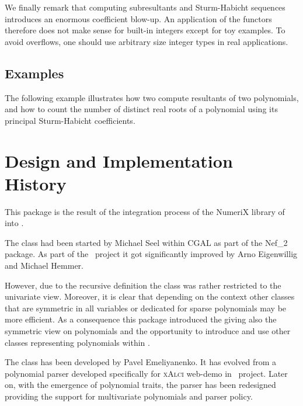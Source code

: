We finally remark that computing subresultants and Sturm-Habicht sequences
introduces an enormous coefficient blow-up.
An application of the functors therefore does not make sense
for built-in integers except for toy examples.
To avoid overflows, one should use arbitrary size integer types
in real applications.

\subsection{Examples}

The following example illustrates how two compute resultants of two
polynomials, and how to count the number of distinct real roots
of a polynomial using its principal Sturm-Habicht coefficients.



\section{Design and Implementation History}

This package is the result of the integration process of the NumeriX library 
of \exacus~\cite{beh+-eeeafcs-05} into \cgal.

The class  had been started by Michael Seel within 
CGAL as part of the Nef\_2 package. As part of the \exacus\ project 
it got significantly improved by Arno Eigenwillig and Michael Hemmer. 

However, due to the recursive definition the class was rather restricted to the 
univariate view. Moreover, it is clear that depending on the context 
other classes that are symmetric in all variables or dedicated 
for sparse polynomials may be more efficient. As a consequence this package 
introduced the  giving also
the symmetric view on polynomials and the opportunity to introduce and use
other classes representing polynomials within \cgal. 

The class  has been developed
by Pavel Emeliyanenko. It has evolved from a polynomial parser developed 
specifically for \textsc{xAlci} web-demo in \exacus\ project. Later on, with the emergence of
polynomial traits, the parser has been redesigned providing the support for 
multivariate polynomials and parser policy.

